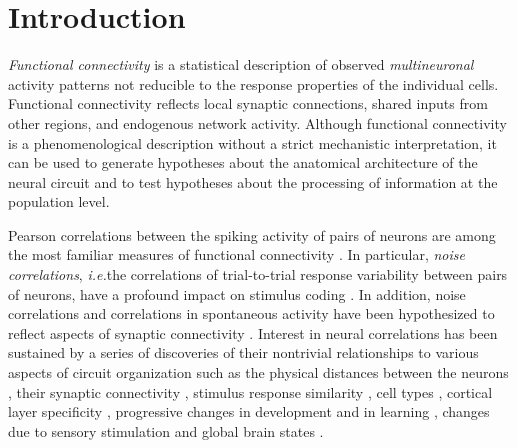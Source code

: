 \section{Introduction}
\emph{Functional connectivity} is a statistical description of observed \emph{multineuronal} activity patterns not reducible to the response properties of the individual cells. Functional connectivity reflects local synaptic connections, shared inputs from other regions, and endogenous network activity. Although functional connectivity is a phenomenological description without a strict mechanistic interpretation, it can be used to generate hypotheses about the anatomical architecture of the neural circuit and to test hypotheses about the processing of information at the population level.

Pearson correlations between the spiking activity of pairs of neurons are among the most familiar measures of functional connectivity \citep{Averbeck:2006, Zohary:1994, Kohn:2005, Bair:2001, Ecker:2010}.  In particular, \emph{noise correlations}, \emph{i.e.}\;the correlations of trial-to-trial response variability between pairs of neurons, have a profound impact on stimulus coding \citep{Zohary:1994, Abbott:1999, Sompolinsky:2001, Nirenberg:2003, Averbeck:2006, Josic:2009, Berens:2011, Ecker:2011}. In addition, noise correlations and correlations in spontaneous activity have been hypothesized to reflect aspects of synaptic connectivity \citep{Gerstein:1964}.  Interest in neural correlations has been sustained by a series of discoveries of their nontrivial relationships to various aspects of circuit organization such as the physical distances between the neurons \citep{Smith:2008, Denman:2013}, their synaptic connectivity \citep{Ko:2011},  stimulus response similarity \citep{Bair:2001, Arieli:1995, Chiu:2002, Kenet:2003, Kohn:2005, Cohen:2008, Cohen:2009, Ecker:2010, Rothschild:2010, Ko:2011, Smith:2013b}, cell types \citep{Hofer:2011}, cortical layer specificity \citep{Hansen:2012, Smith:2013}, progressive changes in development and in learning \citep{Golshani:2009, Gu:2011, Ko:2013}, changes due to sensory stimulation and global brain states \citep{Greenberg:2008, Goard:2009, Kohn:2009, Rothschild:2010, Ecker:2010, Renart:2010}.

